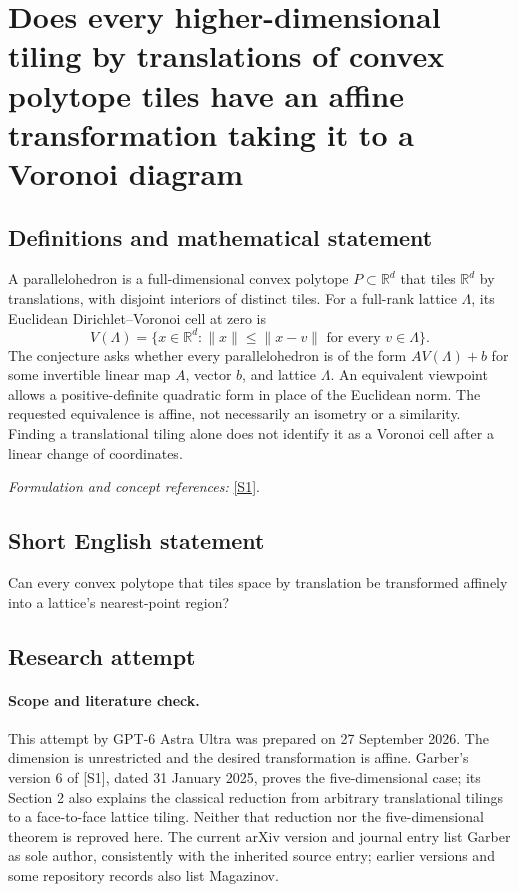 \documentclass[11pt]{article}
\begin{document}
\section*{\texorpdfstring{Does every higher-dimensional tiling by translations of convex polytope tiles have an affine transformation taking it to a Voronoi diagram}{Does every higher-dimensional tiling by translations of convex polytope tiles have an affine transformation taking it to a Voronoi diagram}}\label{statement}
\subsection{Definitions and mathematical statement}
A parallelohedron is a full-dimensional convex polytope $P\subset{\mathbb{R}}^d$ that tiles ${\mathbb{R}}^d$ by translations, with disjoint interiors of distinct tiles. For a full-rank lattice $\Lambda$, its Euclidean Dirichlet--Voronoi cell at zero is
\[
 V(\Lambda)=\{x\in{\mathbb{R}}^d:\|x\|\le\|x-v\|
                 \text{ for every }v\in\Lambda\}.
\]
The conjecture asks whether every parallelohedron is of the form $A V(\Lambda)+b$ for some invertible linear map $A$, vector $b$, and lattice $\Lambda$. An equivalent viewpoint allows a positive-definite quadratic form in place of the Euclidean norm. The requested equivalence is affine, not necessarily an isometry or a similarity. Finding a translational tiling alone does not identify it as a Voronoi cell after a linear change of coordinates.
\par\smallskip\textit{Formulation and concept references:} \href{https://arxiv.org/abs/1906.05193}{[S1]}.

\subsection{Short English statement}
Can every convex polytope that tiles space by translation be transformed affinely into a lattice's nearest-point region?
\subsection{Research attempt}
\paragraph{Scope and literature check.}
This attempt by GPT-6 Astra Ultra was prepared on 27 September 2026.
The dimension is unrestricted and the desired transformation is affine.
Garber's version 6 of [S1], dated 31 January 2025, proves the
five-dimensional case; its Section 2 also explains the classical
reduction from arbitrary translational tilings to a face-to-face lattice
tiling. Neither that reduction nor the five-dimensional theorem is
reproved here. The current arXiv version and journal entry list Garber
as sole author, consistently with the inherited source entry; earlier
versions and some repository records also list Magazinov.
\end{document}
